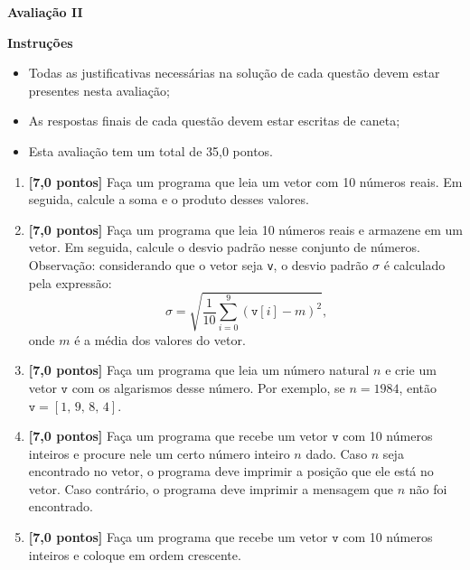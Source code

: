 \documentclass[12pt,a4paper]{article}
\begin{document}
\begin{center}
 \textbf{Avaliação II}
\end{center}

\textbf{Instruções}
\begin{itemize}
 \item Todas as justificativas necessárias na solução de cada questão devem 
 estar presentes nesta avaliação;
 \item As respostas finais de cada questão devem estar escritas de caneta;
 \item Esta avaliação tem um total de 35,0 pontos.
\end{itemize}

\begin{enumerate}
  \item \textbf{[7,0 pontos]} Faça um programa que leia um vetor com 10 números reais.
  Em seguida, calcule a soma e o produto desses valores.
  
  \item \textbf{[7,0 pontos]} Faça um programa que leia 10 números reais e armazene em um vetor.
  Em seguida, calcule o desvio padrão nesse conjunto de números. Observação:
  considerando que o vetor seja \texttt{v}, o desvio padrão $\sigma$ é 
  calculado pela expressão:
  $$\sigma = \sqrt{\frac{1}{10} \sum_{i = 0}^9 (\texttt{v}[i] - m)^2}\textrm{,}$$
  onde $m$ é a média dos valores do vetor.
  
  \item \textbf{[7,0 pontos]} Faça um programa que leia um número natural $n$ e crie um vetor $\texttt{v}$
  com os algarismos desse número. Por exemplo, se $n = 1984$, então
  $\texttt{v} = [1,\,9,\,8,\,4]$.
  
  \item \textbf{[7,0 pontos]} Faça um programa que recebe um vetor $\texttt{v}$ com 10 números 
  inteiros e procure nele um certo número inteiro $n$ dado. Caso $n$ seja encontrado no vetor, 
  o programa deve imprimir a posição que ele está no vetor. Caso contrário, o programa deve 
  imprimir a mensagem que $n$ não foi encontrado.

  \item \textbf{[7,0 pontos]} Faça um programa que recebe um vetor $\texttt{v}$ com 10
  números inteiros e coloque em ordem crescente.

\end{enumerate}
\end{document}
